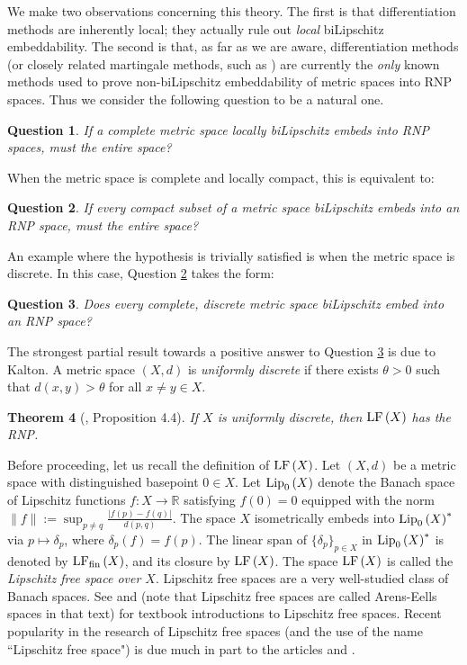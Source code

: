 \documentclass[12pt]{amsart}
\newtheorem{theorem}{Theorem}[section]
\newtheorem{question}[theorem]{Question}
\theoremstyle{definition}
\numberwithin{equation}{section}
\def \R {\mathbb{R}}
\begin{document}
We make two observations concerning this theory. The first is that differentiation methods are inherently local; they actually rule out \emph{local} biLipschitz embeddability. The second is that, as far as we are aware, differentiation methods (or closely related martingale methods, such as \cite[Theorem 1.3]{O}) are currently the \emph{only} known methods used to prove non-biLipschitz embeddability of metric spaces into RNP spaces. Thus we consider the following question to be a natural one.

\begin{question} \label{q:localembed}
If a complete metric space locally biLipschitz embeds into RNP spaces, must the entire space?
\end{question}

When the metric space is complete and locally compact, this is equivalent to:

\begin{question} \label{q:compactembed}
If every compact subset of a metric space biLipschitz embeds into an RNP space, must the entire space?
\end{question}

An example where the hypothesis is trivially satisfied is when the metric space is discrete. In this case, Question \ref{q:compactembed} takes the form:

\begin{question} \label{q:discreteembed}
Does every complete, discrete metric space biLipschitz embed into an RNP space?
\end{question}

The strongest partial result towards a positive answer to Question \ref{q:discreteembed} is due to Kalton. A metric space $(X,d)$ is \emph{uniformly discrete} if there exists $\theta > 0$ such that $d(x,y) > \theta$ for all $x \neq y \in X$.

\begin{theorem}[\cite{K}, Proposition 4.4] \label{thm:unifdiscrete}
If $X$ is uniformly discrete, then $\LF{X}$ has the RNP.
\end{theorem}

Before proceeding, let us recall the definition of $\LF{X}$. Let $(X,d)$ be a metric space with distinguished basepoint $0 \in X$. Let $\Lip{X}$ denote the Banach space of Lipschitz functions $f: X \to \R$ satisfying $f(0)= 0$ equipped with the norm $\|f\| := \sup_{p \neq q} \frac{|f(p)-f(q)|}{d(p,q)}$. The space $X$ isometrically embeds into $\Lip{X}^*$ via $p \mapsto \delta_p$, where $\delta_p(f) = f(p)$. The linear span of $\{\delta_p\}_{p \in X}$ in $\Lip{X}^*$ is denoted by $\LFf{X}$, and its closure by $\LF{X}$. The space $\LF{X}$ is called the \emph{Lipschitz free space over $X$}. Lipschitz free spaces are a very well-studied class of Banach spaces. See \cite[Chapter 10]{Obook} and \cite{W} (note that Lipschitz free spaces are called Arens-Eells spaces in that text) for textbook introductions to Lipschitz free spaces. Recent popularity in the research of Lipschitz free spaces (and the use of the name ``Lipschitz free space") is due much in part to the articles \cite{GK} and \cite{K}.
\end{document}
